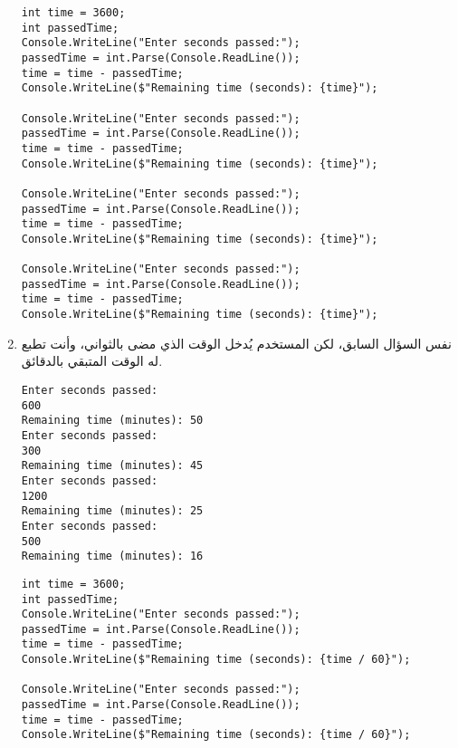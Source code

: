 ﻿\documentclass[12pt]{article}
\begin{document}
\begin{enumerate}
\ifwithsols
\begin{boxSolution}
\begin{english}
\begin{verbatim}
int time = 3600;
int passedTime;
Console.WriteLine("Enter seconds passed:");
passedTime = int.Parse(Console.ReadLine());
time = time - passedTime;
Console.WriteLine($"Remaining time (seconds): {time}");

Console.WriteLine("Enter seconds passed:");
passedTime = int.Parse(Console.ReadLine());
time = time - passedTime;
Console.WriteLine($"Remaining time (seconds): {time}");

Console.WriteLine("Enter seconds passed:");
passedTime = int.Parse(Console.ReadLine());
time = time - passedTime;
Console.WriteLine($"Remaining time (seconds): {time}");

Console.WriteLine("Enter seconds passed:");
passedTime = int.Parse(Console.ReadLine());
time = time - passedTime;
Console.WriteLine($"Remaining time (seconds): {time}");
\end{verbatim}
\end{english}
\end{boxSolution}
\fi

\clearpage
\fi

\item
نفس السؤال السابق، لكن المستخدم يُدخل الوقت الذي مضى بالثواني، وأنت تطبع له الوقت المتبقي بالدقائق. \\
\ifdetailed
\begin{boxExample}
\begin{english}
\begin{verbatim}
Enter seconds passed:
600
Remaining time (minutes): 50
Enter seconds passed:
300
Remaining time (minutes): 45
Enter seconds passed:
1200
Remaining time (minutes): 25
Enter seconds passed:
500
Remaining time (minutes): 16
\end{verbatim}
\end{english}
\end{boxExample}

\ifwithsols
\begin{boxSolution}
\begin{english}
\begin{verbatim}
int time = 3600;
int passedTime;
Console.WriteLine("Enter seconds passed:");
passedTime = int.Parse(Console.ReadLine());
time = time - passedTime;
Console.WriteLine($"Remaining time (seconds): {time / 60}");

Console.WriteLine("Enter seconds passed:");
passedTime = int.Parse(Console.ReadLine());
time = time - passedTime;
Console.WriteLine($"Remaining time (seconds): {time / 60}");


\end{verbatim}
\end{english}
\end{boxSolution}
\end{enumerate}
\end{document}
